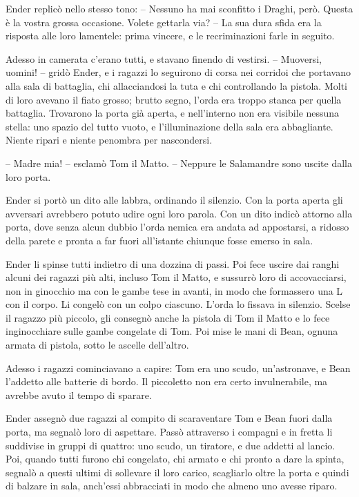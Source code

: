 {Ender replicò nello stesso tono: -- Nessuno ha mai sconfitto i Draghi,
	però. Questa è la vostra grossa occasione. Volete gettarla via? -- La
	sua dura sfida era la risposta alle loro lamentele: prima vincere, e le
	recriminazioni farle in seguito.}

{Adesso in camerata c'erano tutti, e stavano finendo di vestirsi. --
	Muoversi, uomini! -- gridò Ender, e i ragazzi lo seguirono di corsa nei
	corridoi che portavano alla sala di battaglia, chi allacciandosi la tuta
	e chi controllando la pistola. Molti di loro avevano il fiato grosso;
	brutto segno, l'orda era troppo stanca per quella battaglia. Trovarono
	la porta già aperta, e nell'interno non era visibile nessuna stella: uno
	spazio del tutto vuoto, e l'illuminazione della sala era abbagliante.
	Niente ripari e niente penombra per nascondersi.}

{-- Madre mia! -- esclamò Tom il Matto. -- Neppure le Salamandre sono
	uscite dalla loro porta.}

{Ender si portò un dito alle labbra, ordinando il silenzio. Con la porta
	aperta gli avversari avrebbero potuto udire ogni loro parola. Con un
	dito indicò attorno alla porta, dove senza alcun dubbio l'orda nemica
	era andata ad appostarsi, a ridosso della parete e pronta a far fuori
	all'istante chiunque fosse emerso in sala.}

{Ender li spinse tutti indietro di una dozzina di passi. Poi fece uscire
	dai ranghi alcuni dei ragazzi più alti, incluso Tom il Matto, e sussurrò
	loro di accovacciarsi, non in ginocchio ma con le gambe tese in avanti,
	in modo che formassero una L con il corpo. Li congelò con un colpo
	ciascuno. L'orda lo fissava in silenzio. Scelse il ragazzo più piccolo,
	gli consegnò anche la pistola di Tom il Matto e lo fece inginocchiare
	sulle gambe congelate di Tom. Poi mise le mani di Bean, ognuna armata di
	pistola, sotto le ascelle dell'altro.}

{Adesso i ragazzi cominciavano a capire: Tom era uno scudo,
	un'astronave, e Bean l'addetto alle batterie di bordo. Il piccoletto non
	era certo invulnerabile, ma avrebbe avuto il tempo di sparare.}

{Ender assegnò due ragazzi al compito di scaraventare Tom e Bean fuori
	dalla porta, ma segnalò loro di aspettare. Passò attraverso i compagni e
	in fretta li suddivise in gruppi di quattro: uno scudo, un tiratore, e
	due addetti al lancio. Poi, quando tutti furono chi congelato, chi
	armato e chi pronto a dare la spinta, segnalò a questi ultimi di
	sollevare il loro carico, scagliarlo oltre la porta e quindi di balzare
	in sala, anch'essi abbracciati in modo che almeno uno avesse riparo.}

